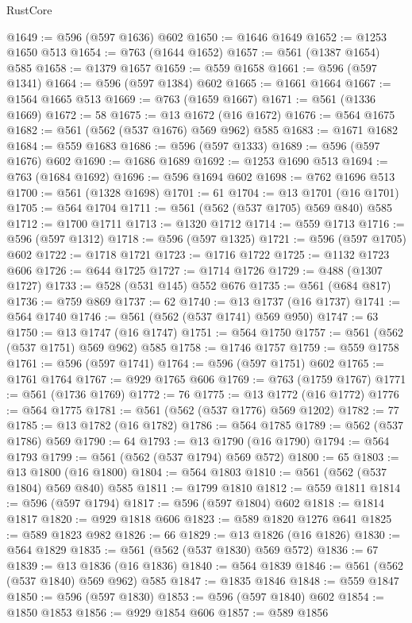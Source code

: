 \begin{lexlean}{RustCore}
\begin{coremodule}
@1649 := @596 (@597 @1636) @602
@1650 := @1646 @1649
@1652 := @1253 @1650 @513
@1654 := @763 (@1644 @1652)
@1657 := @561 (@1387 @1654) @585
@1658 := @1379 @1657
@1659 := @559 @1658
@1661 := @596 (@597 @1341)
@1664 := @596 (@597 @1384) @602
@1665 := @1661 @1664
@1667 := @1564 @1665 @513
@1669 := @763 (@1659 @1667)
@1671 := @561 (@1336 @1669)
@1672 := 58
@1675 := @13 @1672 (@16 @1672)
@1676 := @564 @1675
@1682 := @561 (@562 (@537 @1676) @569 @962) @585
@1683 := @1671 @1682
@1684 := @559 @1683
@1686 := @596 (@597 @1333)
@1689 := @596 (@597 @1676) @602
@1690 := @1686 @1689
@1692 := @1253 @1690 @513
@1694 := @763 (@1684 @1692)
@1696 := @596 @1694 @602
@1698 := @762 @1696 @513
@1700 := @561 (@1328 @1698)
@1701 := 61
@1704 := @13 @1701 (@16 @1701)
@1705 := @564 @1704
@1711 := @561 (@562 (@537 @1705) @569 @840) @585
@1712 := @1700 @1711
@1713 := @1320 @1712
@1714 := @559 @1713
@1716 := @596 (@597 @1312)
@1718 := @596 (@597 @1325)
@1721 := @596 (@597 @1705) @602
@1722 := @1718 @1721
@1723 := @1716 @1722
@1725 := @1132 @1723 @606
@1726 := @644 @1725
@1727 := @1714 @1726
@1729 := @488 (@1307 @1727)
@1733 := @528 (@531 @145) @552 @676
@1735 := @561 (@684 @817)
@1736 := @759 @869
@1737 := 62
@1740 := @13 @1737 (@16 @1737)
@1741 := @564 @1740
@1746 := @561 (@562 (@537 @1741) @569 @950)
@1747 := 63
@1750 := @13 @1747 (@16 @1747)
@1751 := @564 @1750
@1757 := @561 (@562 (@537 @1751) @569 @962) @585
@1758 := @1746 @1757
@1759 := @559 @1758
@1761 := @596 (@597 @1741)
@1764 := @596 (@597 @1751) @602
@1765 := @1761 @1764
@1767 := @929 @1765 @606
@1769 := @763 (@1759 @1767)
@1771 := @561 (@1736 @1769)
@1772 := 76
@1775 := @13 @1772 (@16 @1772)
@1776 := @564 @1775
@1781 := @561 (@562 (@537 @1776) @569 @1202)
@1782 := 77
@1785 := @13 @1782 (@16 @1782)
@1786 := @564 @1785
@1789 := @562 (@537 @1786) @569
@1790 := 64
@1793 := @13 @1790 (@16 @1790)
@1794 := @564 @1793
@1799 := @561 (@562 (@537 @1794) @569 @572)
@1800 := 65
@1803 := @13 @1800 (@16 @1800)
@1804 := @564 @1803
@1810 := @561 (@562 (@537 @1804) @569 @840) @585
@1811 := @1799 @1810
@1812 := @559 @1811
@1814 := @596 (@597 @1794)
@1817 := @596 (@597 @1804) @602
@1818 := @1814 @1817
@1820 := @929 @1818 @606
@1823 := @589 @1820 @1276 @641
@1825 := @589 @1823 @982
@1826 := 66
@1829 := @13 @1826 (@16 @1826)
@1830 := @564 @1829
@1835 := @561 (@562 (@537 @1830) @569 @572)
@1836 := 67
@1839 := @13 @1836 (@16 @1836)
@1840 := @564 @1839
@1846 := @561 (@562 (@537 @1840) @569 @962) @585
@1847 := @1835 @1846
@1848 := @559 @1847
@1850 := @596 (@597 @1830)
@1853 := @596 (@597 @1840) @602
@1854 := @1850 @1853
@1856 := @929 @1854 @606
@1857 := @589 @1856

\end{coremodule}
\end{lexlean}
